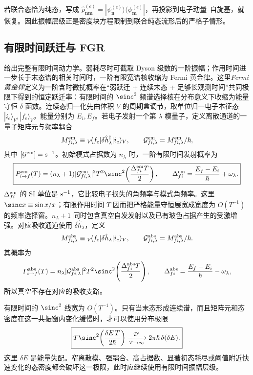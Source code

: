 若联合态恰为纯态，写成
$\hat\rho^{(e)}_{\mathbf n\mathbf m}=|\psi^{(e)}_{\mathbf n}\rangle\langle\psi^{(e)}_{\mathbf m}|$，再投影到电子动量--自旋基，就恢复。因此振幅层级正是密度块方程限制到联合纯态流形后的严格子情形。

\subsection{有限时间跃迁与 FGR}

 给出完整有限时间动力学。弱耗尽时可截取 Dyson 级数的一阶振幅；作用时间进一步长于末态谱的相关时间时，一阶有限宽谱核收缩为 Fermi 黄金律。这里\emph{Fermi 黄金律}定义为一阶含时微扰概率在“弱跃迁 + 连续末态 + 足够长观测时间”共同极限下得到的恒定跃迁率：有限时间的 $\sinc^2$ 频谱选择核在分布意义下收缩为能量守恒 $\delta$ 函数。连续态归一化先由体积 $V$ 的周期盒调节，取单位归一电子本征态 $|i_e\rangle_V,|f_e\rangle_V$，能量分别为 $E_i,E_f$。若电子发射一个第 $\lambda$ 模量子，定义离散通道的一量子矩阵元与频率耦合
\[
M_{fi,\lambda}^{\rm em}
\equiv{}_V\!\langle f_e|\delta\hat h_\lambda^\dagger|i_e\rangle_V,
\qquad
\mathcal G_{fi,\lambda}^{\rm em}=M_{fi,\lambda}^{\rm em}/\hbar,
\]
其中 $[\mathcal G^{\rm em}]={\rm s^{-1}}$。初始模式占据数为 $n_\lambda$ 时，一阶有限时间发射概率为
\begin{equation}
\boxed{
P_{i\to f}^{\rm em}(T)
=(n_\lambda+1)
|\mathcal G_{fi,\lambda}^{\rm em}|^2T^2
\sinc^2\!\left(\frac{\Delta_{fi}^{\rm em}T}{2}\right),
\qquad
\Delta_{fi}^{\rm em}
=\frac{E_f-E_i}{\hbar}+\omega_\lambda .}
\label{eq:universal_boson_finite_time_emission}
\end{equation}
$\Delta_{fi}^{\rm em}$ 的 SI 单位是 ${\rm s^{-1}}$，它比较电子损失的角频率与模式角频率。这里 $\sinc x\equiv\sin x/x$；有限作用时间 $T$ 因而把严格能量守恒展宽成宽度为 $O(T^{-1})$ 的频率选择窗。$n_\lambda+1$ 同时包含真空自发发射以及已有玻色占据产生的受激增强。对应吸收通道使用 $\delta\hat h_\lambda$，定义
\[
M_{fi,\lambda}^{\rm abs}
\equiv{}_V\!\langle f_e|\delta\hat h_\lambda|i_e\rangle_V,
\qquad
\mathcal G_{fi,\lambda}^{\rm abs}=M_{fi,\lambda}^{\rm abs}/\hbar.
\]
其概率为
\[
P_{i\to f}^{\rm abs}(T)
=n_\lambda|\mathcal G_{fi,\lambda}^{\rm abs}|^2T^2
\sinc^2\!\left(\frac{\Delta_{fi}^{\rm abs}T}{2}\right),
\qquad
\Delta_{fi}^{\rm abs}=\frac{E_f-E_i}{\hbar}-\omega_\lambda,
\]
所以真空不存在对应的吸收支路。

有限时间的 $\sinc^2$ 线宽为 $O(T^{-1})$。只有当末态形成连续谱，而且矩阵元和态密度在这一共振窗内变化缓慢时，才可以使用分布极限
\begin{equation}
\boxed{
T\sinc^2\!\left(\frac{\delta E\,T}{2\hbar}\right)
\xrightarrow[T\to\infty]{\mathcal D'}
2\pi\hbar\,\delta(\delta E).}
\label{eq:finite_time_sinc_distribution_limit}
\end{equation}
这里 $\delta E$ 是能量失配。窄离散模、强耦合、高占据数、显著初态耗尽或阈值附近快速变化的态密度都会破坏这一极限，此时应继续使用有限时间振幅层级。

